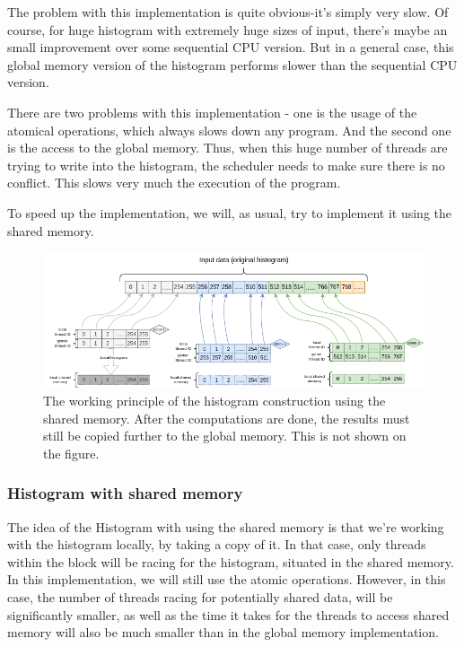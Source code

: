 The problem with this implementation is quite obvious-it's simply 
very slow. Of course, for huge histogram with extremely huge sizes of input, 
there's maybe an small improvement over some sequential CPU version. But in 
a general case, this global memory version of the histogram 
performs slower than the sequential CPU version.



There are two problems with this implementation - one is the usage of the 
atomical operations, which always slows down any program. And the second one is 
the access to the global memory. Thus, when this huge number of threads are trying to 
write into the histogram, the scheduler needs to make sure there is no conflict. This 
slows very much the execution of the program.

To speed up the implementation, we will, as usual, try to implement it using the 
shared memory.

\begin{figure}[ht!]
  \vspace{-0.3cm}
  \centering
  \includegraphics[width=\textwidth]{./pngs/shared_histogram.drawio.png}
  \caption{The working principle of the histogram construction using the shared memory.
  After the computations are done, the results must still be copied further to the global memory. 
  This is not shown on the figure.}
  \label{fig:shared_hist}
\end{figure}

\subsubsection*{Histogram with shared memory}

The idea of the Histogram with using the shared memory is that we're working with the 
histogram locally, by taking a copy of it. In that case, only threads within the block will 
be racing for the histogram, situated in the shared memory. 
In this implementation, we will still use the atomic operations.
However, in this case, the number of threads racing for potentially shared data, will be significantly 
smaller, as well as the time it takes for the threads to access shared memory will also be much smaller 
than in the global memory implementation.

